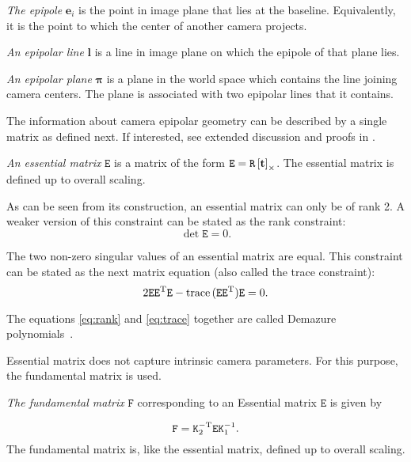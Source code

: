\begin{defn}
\textit{The epipole} $\mathbf{e}_i$ is the point in image plane that lies at the baseline. Equivalently, it is the point to which the center of another camera projects. 
\end{defn}

\begin{defn}
\textit{An epipolar line} $\mathbf{l}$ is a line in image plane on which the epipole of that plane lies.
\end{defn}

\begin{defn}
\textit{An epipolar plane} $\mathbf{\pi}$ is a plane in the world space which contains the line joining camera centers. The plane is associated with two epipolar lines that it contains.
\end{defn}

The information about camera epipolar geometry can be described by a single matrix as defined next. If interested, see extended discussion and proofs in \cite{HartZiss}.

\begin{defn}
\textit{An essential matrix} $\mathtt{E}$ is a matrix of the form $ \mathtt{E} = \mathtt{R} \left[\mathbf{t}\right]_\times$. The essential matrix is defined up to overall scaling.
\end{defn}

As can be seen from its construction, an essential matrix can only be of rank 2. A weaker version of this constraint can be stated as the rank constraint: 
\begin{equation}
\det{\mathtt{E}} = 0.
\label{eq:rank}
\end{equation}

The two non-zero singular values of an essential matrix are equal. This constraint can be stated as the next matrix equation (also called the trace constraint):
\begin{equation}
2 \mathtt{E} \mathtt{E}^{\text{T}} \mathtt{E} - \operatorname{trace}{(\mathtt{E} \mathtt{E}^{\text{T}})} \mathtt{E} = 0.
\label{eq:trace}
\end{equation}

The equations \ref{eq:rank} and \ref{eq:trace} together are called  Demazure polynomials~\cite{Demazure}.

Essential matrix does not capture intrinsic camera parameters. For this purpose, the fundamental matrix is used.

\begin{defn}
\textit{The fundamental matrix} $\mathtt{F}$ corresponding to an Essential matrix $\mathtt{E}$ is given by

\begin{equation}
\mathtt{F} = \mathtt{K}_2^{-\text{T}} \mathtt{E} \mathtt{K}_1^{-1}. 
\label{eq:fundamental}
\end{equation}
 The fundamental matrix is, like the essential matrix, defined up to overall scaling.
\end{defn}

